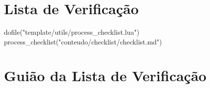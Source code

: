 %

\tableofcontents
\newpage

\section{Lista de Verificação}\label{sec:lista-de-verificacao}
\begin{small}
\begin{luacode}
dofile("template/utils/process_checklist.lua")
process_checklist("conteudo/checklist/checklist.md")
\end{luacode}
\end{small}
\newpage

\section{Guião da Lista de Verificação}\label{sec:guiao-da-lista-de-verificacao}
\newpage

\printbibliography[title={Referências}]